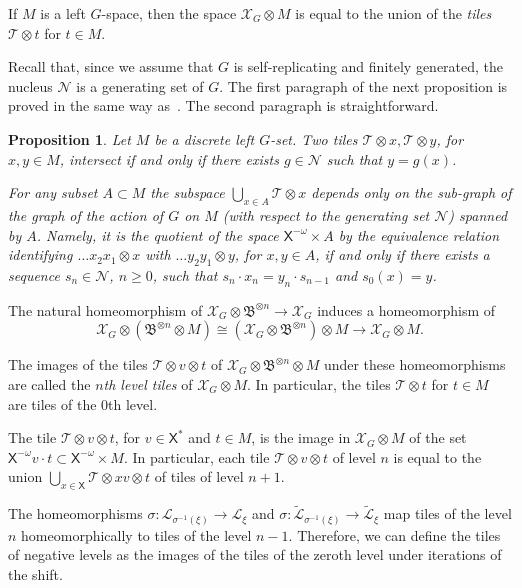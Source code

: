 \documentclass[11pt]{amsart}
\newcommand{\bim}{\mathfrak{B}}
\newcommand{\arr}{\longrightarrow}
\newcommand{\limg}[1][G]{\mathcal{X}_{#1}}
\newcommand{\til}{\mathcal{T}}
\newcommand{\xs}{\alb^\ast}
\newcommand{\leaf}{\mathcal{L}}
\newcommand{\leaftilde}{\widetilde{\leaf}}
\newcommand{\xmo}{\alb^{-\omega}}
\newcommand{\alb}{\ensuremath{\mathsf{X}}}%
\newcommand{\nuke}{\ensuremath{\mathcal{N}}}%
\theoremstyle{definition}
\theoremstyle{plain}
\newtheorem{main thm}{Theorem}
\newtheorem{prop}[defin]{Proposition}
\theoremstyle{remark}
\theoremstyle{plain}
\begin{document}
If $M$ is a left $G$-space, then the space $\limg\otimes M$ is equal to the union of the \emph{tiles} $\til\otimes t$ for $t\in M$. 

Recall that, since we assume that $G$ is self-replicating and finitely generated, the nucleus $\nuke$ is a generating set of $G$. 
The first paragraph of the next proposition is proved in the same way as~\cite[Proposition~3.3.5]{Nek:book}. The second paragraph is straightforward.

\begin{prop}
\label{prop:tiles}
Let $M$ be a discrete left $G$-set. Two tiles $\til\otimes x, \til\otimes y$, for $x, y\in M$, intersect if and only if there exists $g\in\nuke$ such that $y=g(x)$.

For any subset $A\subset M$ the subspace $\bigcup_{x\in A}\til\otimes x$ depends only on the sub-graph of the graph of the action of $G$ on $M$ (with respect to the generating set $\nuke$) spanned by $A$. Namely, it is the quotient of the space $\xmo\times A$ by the equivalence relation identifying $\ldots x_2x_1\otimes x$ with $\ldots y_2y_1\otimes y$, for $x, y\in A$, if and only if there exists a sequence $s_n\in\nuke$, $n\ge 0$, such that $s_n\cdot x_n=y_n\cdot s_{n-1}$ and $s_0(x)=y$.
\end{prop}

The natural homeomorphism of $\limg\otimes\bim^{\otimes n}\arr\limg$ induces a homeomorphism of \[\limg\otimes (\bim^{\otimes n}\otimes M)\cong (\limg\otimes\bim^{\otimes n})\otimes M\arr\limg\otimes M.\]

The images of the tiles $\til\otimes v\otimes t$ of $\limg\otimes\bim^{\otimes n}\otimes M$ under these homeomorphisms are called the \emph{$n$th level tiles} of $\limg\otimes M$. In particular, the tiles $\til\otimes t$ for $t\in M$ are tiles of the $0$th level.

The tile $\til\otimes v\otimes t$, for $v\in\xs$  and $t\in M$, is the image in $\limg\otimes M$ of the set $\xmo v\cdot t\subset\xmo\times M$. In particular, each tile $\til\otimes v\otimes t$ of level $n$ is equal to the union $\bigcup_{x\in\alb}\til\otimes xv\otimes t$ of tiles of level $n+1$.

The homeomorphisms $\sigma\colon\leaf_{\sigma^{-1}(\xi)}\arr\leaf_{\xi}$ and $\sigma\colon\leaftilde_{\sigma^{-1}(\xi)}\arr\leaftilde_\xi$ map tiles of the level $n$ homeomorphically to tiles of the level $n-1$. Therefore, we can define the tiles of negative levels as the images of the tiles of the zeroth level under iterations of the shift.
\end{document}
